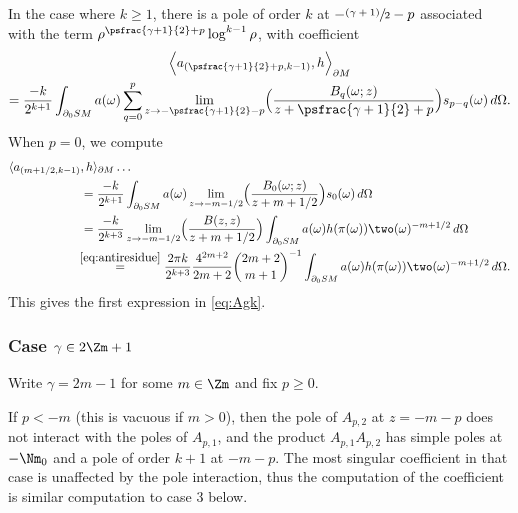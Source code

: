 In the case where $k\ge 1$, there is a pole of order $k$ at $-\sfrac{(\gamma+1)}{2}-p$ associated with the term $\rho^{\psfrac{\gamma+1}{2}+p}\log^{k-1} \rho$, with coefficient
\begin{multline*}
\Bigl\langle a_{(\psfrac{\gamma+1}{2}+p, k-1)}, h\Bigr\rangle_{\partial M}\\
= \frac{-k}{2^{k+1}} \int_{\partial_0 SM} a(\omega)
\sum_{q=0}^p \lim_{z\to -\psfrac{\gamma+1}{2}-p} \Bigl(\frac{B_q(\omega; z)}{z+ \psfrac{\gamma+1}{2}+p}\Bigr) s_{p-q}(\omega)\,d\Omega.
\end{multline*}
When $p=0$, we compute
\begin{align*}
\langle a_{(m+1/2, k-1)}&, h\rangle_{\partial M} \ldots \\
&= \frac{-k}{2^{k+1}} \int_{\partial_0 SM} a(\omega) \lim_{z\to -m-1/2} \Bigl(\frac{B_0(\omega; z)}{z+ m+ 1/2}\Bigr) s_{0}(\omega)\,d\Omega \\
&= \frac{-k}{2^{k+3}} \lim_{z\to -m-1/2} \Bigl(\frac{B(z,z)}{z+ m+ 1/2}\Bigr) \int_{\partial_0 SM} a(\omega) h(\pi(\omega)) \two(\omega)^{-m+1/2} \,d\Omega \\
&\!\!\stackrel{\eqref{eq:antiresidue}}{=} \frac{2\pi k}{2^{k+3}} \frac{4^{2m+2}}{2m+2} \binom{2m+2}{m+1}^{-1} \int_{\partial_0 SM} a(\omega) h(\pi(\omega)) \two(\omega)^{-m+1/2} \,d\Omega.
\end{align*}
This gives the first expression in \eqref{eq:Agk}.

\subsubsection*{Case $\gamma\in 2\Zm + 1$}
Write $\gamma = 2m-1$ for some $m\in \Zm$ and fix $p\ge 0$.

If $p<-m$ (this is vacuous if $m>0$), then the pole of $A_{p,2}$ at $z = -m-p$ does not interact with the poles of $A_{p,1}$, and the product $A_{p,1} A_{p,2}$ has simple poles at $-\Nm_0$ and a pole of order $k+1$ at $-m-p$. The most singular coefficient in that case is unaffected by the pole interaction, thus the computation of the coefficient is similar computation to case 3 below.

